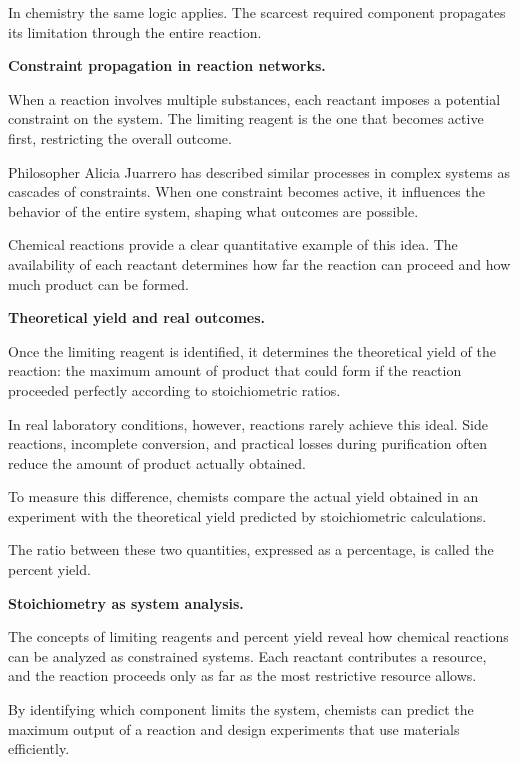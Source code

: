 \documentclass[11pt, openany]{book}
\theoremstyle{plain}
\theoremstyle{definition}
\theoremstyle{remark}
\begin{document}
In chemistry the same logic applies. The scarcest required component
propagates its limitation through the entire reaction.

\medskip

\textbf{Constraint propagation in reaction networks.}

When a reaction involves multiple substances, each reactant imposes a
potential constraint on the system. The limiting reagent is the one that
becomes active first, restricting the overall outcome.

Philosopher Alicia Juarrero has described similar processes in complex
systems as cascades of constraints. When one constraint becomes active,
it influences the behavior of the entire system, shaping what outcomes
are possible.

Chemical reactions provide a clear quantitative example of this idea.
The availability of each reactant determines how far the reaction can
proceed and how much product can be formed.

\medskip

\textbf{Theoretical yield and real outcomes.}

Once the limiting reagent is identified, it determines the theoretical
yield of the reaction: the maximum amount of product that could form if
the reaction proceeded perfectly according to stoichiometric ratios.

In real laboratory conditions, however, reactions rarely achieve this
ideal. Side reactions, incomplete conversion, and practical losses
during purification often reduce the amount of product actually
obtained.

To measure this difference, chemists compare the actual yield obtained
in an experiment with the theoretical yield predicted by stoichiometric
calculations.

The ratio between these two quantities, expressed as a percentage, is
called the percent yield.

\medskip

\textbf{Stoichiometry as system analysis.}

The concepts of limiting reagents and percent yield reveal how chemical
reactions can be analyzed as constrained systems. Each reactant
contributes a resource, and the reaction proceeds only as far as the
most restrictive resource allows.

By identifying which component limits the system, chemists can predict
the maximum output of a reaction and design experiments that use
materials efficiently.
\end{document}
